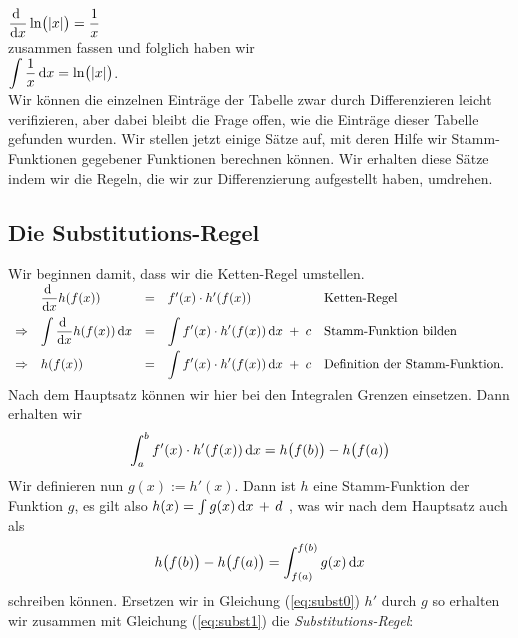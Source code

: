 $\displaystyle\frac{\textrm{d}\;}{\textrm{d}x} \ln\bigl(|x|\bigr) = \frac{1}{x}$
\\[0.2cm]
zusammen fassen und folglich haben wir
\\[0.2cm]
\hspace*{1.3cm}
 $\displaystyle\int \frac{1}{x}\,\textrm{d} x = \ln\bigl(|x|\bigr)$.
\\[0.2cm]
Wir k\"onnen die einzelnen Eintr\"age der Tabelle zwar durch Differenzieren leicht
verifizieren, aber dabei bleibt die Frage offen, wie die Eintr\"age dieser Tabelle gefunden
wurden.  Wir stellen jetzt einige S\"atze auf, mit deren Hilfe wir Stamm-Funktionen
gegebener Funktionen berechnen k\"onnen.  Wir erhalten diese S\"atze indem wir die
Regeln, die wir zur Differenzierung aufgestellt haben, umdrehen.  


\subsection{Die Substitutions-Regel}
Wir beginnen damit, dass wir die Ketten-Regel umstellen.
\\[0.3cm]
\hspace*{1.3cm}
$
\begin{array}[t]{llcll}
            & \displaystyle\frac{\textrm{d}\;}{\textrm{d}x} h(f(x)) & = & f'(x) \cdot  h'(f(x)) & \mbox{Ketten-Regel} \\[0.3cm]
\Rightarrow & \displaystyle\int\displaystyle\frac{\textrm{d}\;}{\textrm{d}x} h(f(x))\, \textrm{d} x & = & \displaystyle\int f'(x) \cdot  h'(f(x))\, \textrm{d} x  \;+\; c & \mbox{Stamm-Funktion bilden} \\[0.3cm]
\Rightarrow & h(f(x))  & = & \displaystyle\int f'(x) \cdot  h'(f(x))\, \textrm{d} x \;+\; c   & \mbox{Definition der Stamm-Funktion}. \\[0.3cm]
\end{array}
$
\\[0.3cm]
Nach dem Hauptsatz k\"onnen wir hier bei den Integralen Grenzen einsetzen. Dann erhalten wir
\begin{equation}
  \label{eq:subst0}
  \int_a^b f'(x) \cdot  h'(f(x))\, \textrm{d} x  =  h\bigl(f(b)\bigr) - h\bigl(f(a)\bigr)
\end{equation} 
Wir definieren nun $g(x) := h'(x)$.  Dann ist $h$ eine Stamm-Funktion der Funktion $g$, es
gilt also $h(x) = \int g(x)\, \textrm{d} x \,+\, d$ , was wir nach dem Hauptsatz auch als
\begin{equation}
  \label{eq:subst1}
h\bigl(f(b)\bigr) - h\bigl(f(a)\bigr) = \int_{f(a)}^{f(b)} g(x)\,\textrm{d} x  
\end{equation}
schreiben k\"onnen.
Ersetzen wir in Gleichung (\ref{eq:subst0})  $h'$
durch $g$ so erhalten wir zusammen mit Gleichung (\ref{eq:subst1})  die \emph{Substitutions-Regel}:
